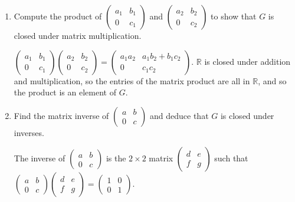 \documentclass{article}
\begin{document}
\begin{enumerate}[label=(\alph*)]
    \item Compute the product of $\begin{pmatrix}a_1 & b_1 \\ 0 & c_1\end{pmatrix}$ and $\begin{pmatrix}a_2 & b_2 \\ 0 & c_2\end{pmatrix}$ to show that $G$ is closed under matrix multiplication.
    
          $\begin{pmatrix}a_1 & b_1 \\ 0 & c_1\end{pmatrix}\begin{pmatrix}a_2 & b_2 \\ 0 & c_2\end{pmatrix} = \begin{pmatrix}a_1 a_2 & a_1 b_2 + b_1 c_2 \\ 0 & c_1 c_2\end{pmatrix}$. $\mathbb{R}$ is closed under addition and multiplication, so the entries of the matrix product are all in $\mathbb{R}$, and so the product is an element of $G$.

    \item Find the matrix inverse of $\begin{pmatrix}a & b \\ 0 & c\end{pmatrix}$ and deduce that $G$ is closed under inverses.

          The inverse of $\begin{pmatrix}a & b \\ 0 & c\end{pmatrix}$ is the $2 \times 2$ matrix $\begin{pmatrix}d & e \\ f & g\end{pmatrix}$ such that \newline $\begin{pmatrix}a & b \\ 0 & c\end{pmatrix}\begin{pmatrix}d & e \\ f & g\end{pmatrix} = \begin{pmatrix}1 & 0 \\ 0 & 1\end{pmatrix}$.


\end{enumerate}
\end{document}
